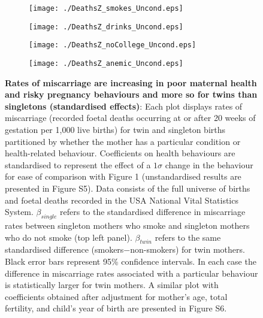 \documentclass[11pt]{article}
\begin{document}
\begin{spacing}{1}
\begin{figure}[htpb!]
\begin{subfigure}{.5\textwidth}
  \texttt{[image: ./DeathsZ\_smokes\_Uncond.eps]}
\end{subfigure}%
\begin{subfigure}{.5\textwidth}
  \texttt{[image: ./DeathsZ\_drinks\_Uncond.eps]}
\end{subfigure}
\begin{subfigure}{.5\textwidth}
  \texttt{[image: ./DeathsZ\_noCollege\_Uncond.eps]}
\end{subfigure}%
\begin{subfigure}{.5\textwidth}
  \texttt{[image: ./DeathsZ\_anemic\_Uncond.eps]}
\end{subfigure}
\vspace{5mm}
\caption{\textbf{Rates of miscarriage are increasing in poor maternal health and risky pregnancy behaviours and more so for twins than singletons (standardised effects)}: {\footnotesize Each plot displays rates of miscarriage (recorded foetal deaths occurring at or after 20 weeks of gestation per 1,000 live births) for twin and singleton births partitioned by whether the mother has a particular condition or health-related behaviour. Coefficients on health behaviours are standardised to represent the effect of a $1\sigma$ change in the behaviour for ease of comparison with Figure 1 (unstandardised results are presented in Figure S5). Data consists of the full universe of births and foetal deaths recorded in the USA National Vital Statistics System. $\beta_{single}$ refers to the standardised difference in miscarriage rates between singleton mothers who smoke and singleton mothers who do not smoke (top left panel). $\beta_{twin}$ refers to the same standardised difference (smokers$-$non-smokers) for twin mothers.  Black error bars represent 95\% confidence intervals. In each case the difference in miscarriage rates associated with a particular behaviour is statistically larger for twin mothers.  A similar plot with coefficients obtained after adjustment for mother's age, total fertility, and child's year of birth are presented in Figure S6.}}
\label{fig:mech}
\end{figure}
\end{spacing}
\end{document}
